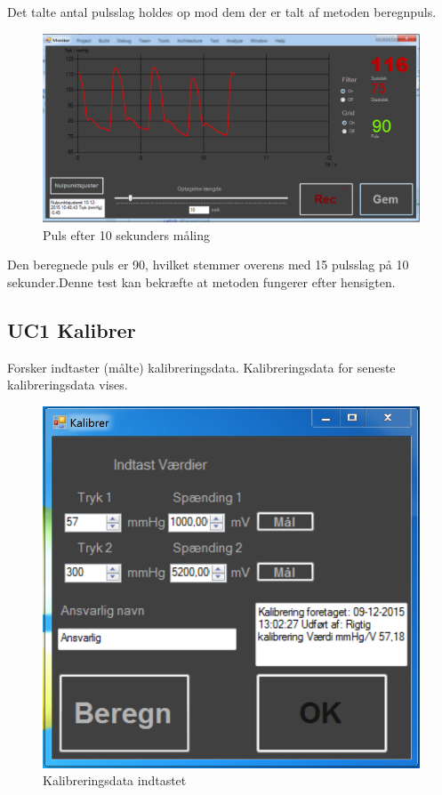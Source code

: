 Det talte antal pulsslag holdes op mod dem der er talt af metoden beregnpuls.

\begin{figure}[H]
	\centering
	\includegraphics[width=1\textwidth]{Figurer/Pulstest_monitor}
	\caption{Puls efter 10 sekunders måling}
\end{figure}


Den beregnede puls er 90, hvilket stemmer overens med 15 pulsslag på 10 sekunder.Denne test kan bekræfte at metoden fungerer efter hensigten.

\subsection{UC1 Kalibrer}

Forsker indtaster (målte) kalibreringsdata. Kalibreringsdata for seneste kalibreringsdata vises.

\begin{figure}[H]
	\centering
	\includegraphics[width=1\textwidth]{Figurer/Test_Kalibrer_1}
	\caption{Kalibreringsdata indtastet}
\end{figure}

